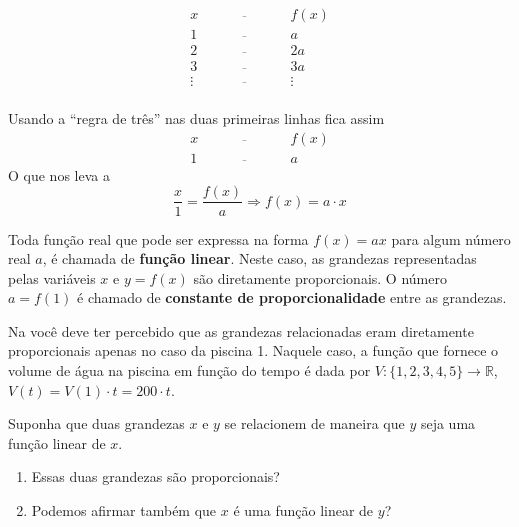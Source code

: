 \[\begin{array}{ccc}
x\quad &\overline{\quad \quad \quad}& \quad f(x) \\
1 \quad &\overline{\quad \quad \quad}& \quad a \\
2 \quad &\overline{\quad \quad \quad}& \quad 2a \\
3 \quad &\overline{\quad \quad \quad}& \quad 3a \\
\vdots \quad &\overline{\quad \quad \quad}& \quad \vdots\\
  \end{array}\]

\begin{observation}
Usando a ``regra de três'' nas duas primeiras linhas fica assim
\[\begin{array}{ccc}
x \quad &\overline{\quad \quad \quad}& \quad f(x)\\
1\quad &\overline{\quad \quad \quad}& \quad a \end{array}\]
O que nos leva a
\[\dfrac x1 = \dfrac {f(x)}a \Longrightarrow f(x) = a\cdot x\]
\end{observation}

Toda função real que pode ser expressa na forma $f(x)=ax$ para algum número real $a$, é chamada de \textbf{função linear}. Neste caso, as grandezas representadas pelas variáveis $x$ e $y=f(x)$ são diretamente proporcionais. O número $a=f(1)$ é chamado de \textbf{constante de proporcionalidade} entre as grandezas.


Na  você deve ter percebido que as grandezas relacionadas eram diretamente proporcionais apenas no caso da piscina 1. Naquele caso, a função que fornece o volume de água na piscina em função do tempo é dada por \(V:\{1,2,3,4,5\}\to \mathbb{R}\),   \(V(t)=V(1)\cdot t=200\cdot t\).

\begin{reflection}

Suponha que duas grandezas \(x\) e \(y\) se relacionem de maneira que \(y\) seja uma função linear de \(x\).
\begin{enumerate}
\item {} 
Essas duas grandezas são proporcionais?

\item {} 
Podemos afirmar também que \(x\) é uma função linear de \(y\)?

\end{enumerate}
\end{reflection}

